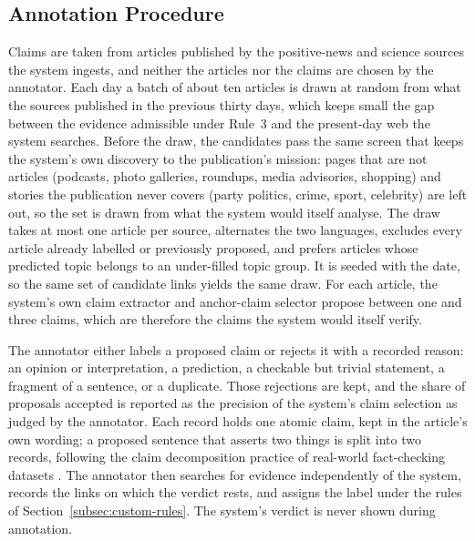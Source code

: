 
\subsection{Annotation Procedure}
\label{subsec:custom-procedure}

Claims are taken from articles published by the positive-news and
science sources the system ingests, and neither the articles nor the
claims are chosen by the annotator. Each day a batch of about ten
articles is drawn at random from what the sources published in the
previous thirty days, which keeps small the gap between the evidence
admissible under Rule~3 and the present-day web the system searches.
Before the draw, the candidates pass the same screen that keeps the
system's own discovery to the publication's mission: pages that are not
articles (podcasts, photo galleries, roundups, media advisories,
shopping) and stories the publication never covers (party politics,
crime, sport, celebrity) are left out, so the set is drawn from what the
system would itself analyse. The draw takes at most one article per
source, alternates the two languages, excludes every article already
labelled or previously proposed, and prefers articles whose predicted
topic belongs to an under-filled topic group. It is seeded with the
date, so the same set of candidate links yields the same draw.
For each article, the system's own claim extractor and anchor-claim
selector propose between one and three claims, which are therefore
the claims the system would itself verify.

The annotator either labels a proposed claim or rejects it with a
recorded reason: an opinion or interpretation, a prediction, a
checkable but trivial statement, a fragment of a sentence, or a
duplicate. Those rejections are kept, and the share of proposals
accepted is reported as the precision of the system's claim
selection as judged by the annotator. Each record holds one atomic
claim, kept in the article's own wording; a proposed sentence that
asserts two things is split into two records, following the claim
decomposition practice of real-world fact-checking datasets
\cite{guo2022survey}. The annotator then searches for evidence
independently of the system, records the links on which the verdict
rests, and assigns the label under the rules of
Section~\ref{subsec:custom-rules}. The system's verdict is never
shown during annotation.

